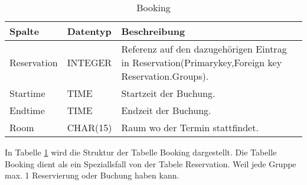 \documentclass[10pt,a4paper]{article}
\begin{document}
\begin{table}[h]
\centering
\caption{Booking}
	\label{tab:Booking}
    \begin{tabular}{| l | l | l | l |}
    \hline
    \rowcolor{lightgray} Spalte & Datentyp & Beschreibung  \\ \hline
    Reservation  & INTEGER & Referenz auf den dazugehörigen Eintrag in Reservation(Primarykey,Foreign key Reservation.Groups). \\ \hline
    Startime & TIME & Startzeit der Buchung. \\ \hline
    Endtime & TIME & Endzeit der Buchung. \\ \hline
    Room & CHAR(15) & Raum wo der Termin stattfindet. \\ \hline
    \end{tabular}
\end{table}

In Tabelle \ref{tab:Booking} wird die Struktur der Tabelle Booking dargestellt. Die Tabelle Booking dient als ein Speziallsfall von der Tabele Reservation. Weil jede Gruppe max. 1 Reservierung oder Buchung haben kann.
\end{document}
